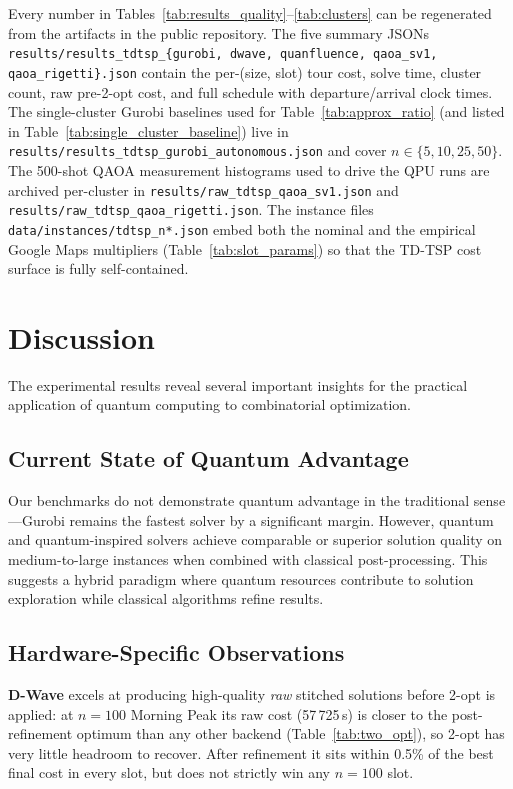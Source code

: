 \documentclass[conference]{IEEEtran}
\begin{document}
Every number in Tables~\ref{tab:results_quality}--\ref{tab:clusters} can be regenerated from the artifacts in the public repository. The five summary JSONs \texttt{results/results\_tdtsp\_\{gurobi, dwave, quanfluence, qaoa\_sv1, qaoa\_rigetti\}.json} contain the per-(size, slot) tour cost, solve time, cluster count, raw pre-2-opt cost, and full schedule with departure/arrival clock times. The single-cluster Gurobi baselines used for Table~\ref{tab:approx_ratio} (and listed in Table~\ref{tab:single_cluster_baseline}) live in \texttt{results/results\_tdtsp\_gurobi\_autonomous.json} and cover $n \in \{5, 10, 25, 50\}$. The 500-shot QAOA measurement histograms used to drive the QPU runs are archived per-cluster in \texttt{results/raw\_tdtsp\_qaoa\_sv1.json} and \texttt{results/raw\_tdtsp\_qaoa\_rigetti.json}. The instance files \texttt{data/instances/tdtsp\_n*.json} embed both the nominal and the empirical Google Maps multipliers (Table~\ref{tab:slot_params}) so that the TD-TSP cost surface is fully self-contained.

\section{Discussion}

The experimental results reveal several important insights for the practical application of quantum computing to combinatorial optimization.

\subsection{Current State of Quantum Advantage}

Our benchmarks do not demonstrate quantum advantage in the traditional sense---Gurobi remains the fastest solver by a significant margin. However, quantum and quantum-inspired solvers achieve comparable or superior solution quality on medium-to-large instances when combined with classical post-processing. This suggests a hybrid paradigm where quantum resources contribute to solution exploration while classical algorithms refine results.

\subsection{Hardware-Specific Observations}

\textbf{D-Wave} excels at producing high-quality \emph{raw} stitched solutions before 2-opt is applied: at $n=100$ Morning Peak its raw cost (57\,725\,s) is closer to the post-refinement optimum than any other backend (Table~\ref{tab:two_opt}), so 2-opt has very little headroom to recover. After refinement it sits within 0.5\% of the best final cost in every slot, but does not strictly win any $n=100$ slot.
\end{document}
